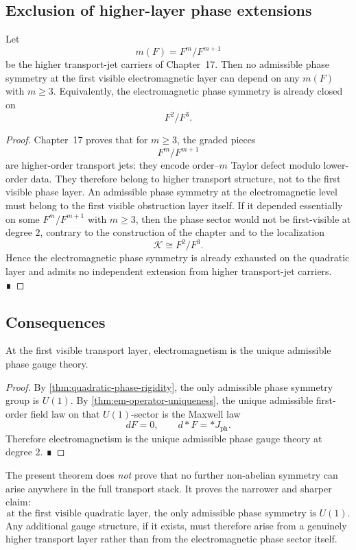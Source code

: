 \subsection{Exclusion of higher-layer phase extensions}
\begin{theorem}
	Let
	\[
		m(F)=F^m/F^{m+1}
	\]
	be the higher transport-jet carriers of Chapter~17.
	Then no admissible phase symmetry at the first visible electromagnetic
	layer can depend on any \(m(F)\) with \(m\ge 3\).
	Equivalently, the electromagnetic phase symmetry is already closed on
	\[
		F^2/F^3.
	\]
\end{theorem}
\begin{proof}
	Chapter~17 proves that for \(m\ge 3\), the graded pieces
	\[
		F^m/F^{m+1}
	\]
	are higher-order transport jets: they encode order--\(m\) Taylor defect
	modulo lower-order data.
	They therefore belong to higher transport structure, not to the first
	visible phase layer.
	An admissible phase symmetry at the electromagnetic level must belong to
	the first visible obstruction layer itself.
	If it depended essentially on some \(F^m/F^{m+1}\) with \(m\ge 3\), then
	the phase sector would not be first-visible at degree \(2\), contrary to
	the construction of the chapter and to the localization
	\[
		\mathcal K\cong F^2/F^3.
	\]
	Hence the electromagnetic phase symmetry is already exhausted on the
	quadratic layer and admits no independent extension from higher
	transport-jet carriers. ∎
\end{proof}
\subsection{Consequences}
\begin{corollary}
	At the first visible transport layer, electromagnetism is the unique
	admissible phase gauge theory.
\end{corollary}
\begin{proof}
	By \cref{thm:quadratic-phase-rigidity}, the only admissible phase
	symmetry group is \(U(1)\).
	By \cref{thm:em-operator-uniqueness}, the
	unique admissible first-order field law on that \(U(1)\)-sector is the
	Maxwell law
	\[
		dF=0,\qquad d{*}F={*}J_{\mathrm{ph}}.
	\]
	Therefore electromagnetism is the unique admissible phase gauge theory at
	degree \(2\). ∎
\end{proof}
\begin{remark}
	The present theorem does \emph{not} prove that no further non-abelian
	symmetry can arise anywhere in the full transport stack.
	It proves the narrower and sharper claim:
	\[
		\boxed{
			\text{at the first visible quadratic layer, the only admissible phase
				symmetry is }U(1).
		}
	\]
	Any additional gauge structure, if it exists, must therefore arise from
	a genuinely higher transport layer rather than from the electromagnetic
	phase sector itself.
\end{remark}

